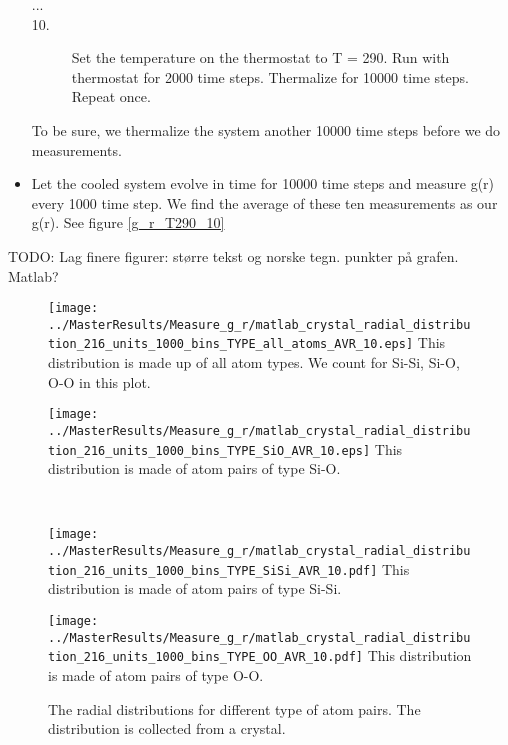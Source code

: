 \begin{itemize}
\begin{description}
      \item[...] 
      \item[10.] Set the temperature on the thermostat to T = 290. Run with thermostat for 2000 time steps. Thermalize for 10000 time steps. Repeat once.
      \end{description}
      To be sure, we thermalize the system another 10000 time steps before we do measurements.
\item Let the cooled system evolve in time for 10000 time steps and measure g(r) every 1000 time step. We find the average of these ten measurements as our g(r). See figure \ref{g_r_T290_10}
\end{itemize}





TODO: Lag finere figurer: større tekst og  norske tegn. punkter på grafen. Matlab?
\begin{figure}[H]
  \centering
  \begin{minipage}[b]{0.45\textwidth}
    \centering
    \texttt{[image: ../MasterResults/Measure\_g\_r/matlab\_crystal\_radial\_distribution\_216\_units\_1000\_bins\_TYPE\_all\_atoms\_AVR\_10.eps]}
    This distribution is made up of all atom types. We count for Si-Si, Si-O, O-O in this plot. 
  \end{minipage}
  \hspace{0.5cm}
  \begin{minipage}[b]{0.45\textwidth}
    \centering
    \texttt{[image: ../MasterResults/Measure\_g\_r/matlab\_crystal\_radial\_distribution\_216\_units\_1000\_bins\_TYPE\_SiO\_AVR\_10.eps]}
    This distribution is made of atom pairs of type Si-O.
  \end{minipage} \\[0.4cm]
  \begin{minipage}[b]{0.45\textwidth}
    \centering
    \texttt{[image: ../MasterResults/Measure\_g\_r/matlab\_crystal\_radial\_distribution\_216\_units\_1000\_bins\_TYPE\_SiSi\_AVR\_10.pdf]}
    This distribution is made of atom pairs of type Si-Si.
  \end{minipage}
  \hspace{0.5cm}
  \begin{minipage}[b]{0.45\textwidth}
    \centering
    \texttt{[image: ../MasterResults/Measure\_g\_r/matlab\_crystal\_radial\_distribution\_216\_units\_1000\_bins\_TYPE\_OO\_AVR\_10.pdf]}
    This distribution is made of atom pairs of type O-O.
  \end{minipage} %
  \caption{The radial distributions for different type of atom pairs. The distribution is collected from a crystal.}
  \label{g_r_crystal_10}
\end{figure}

